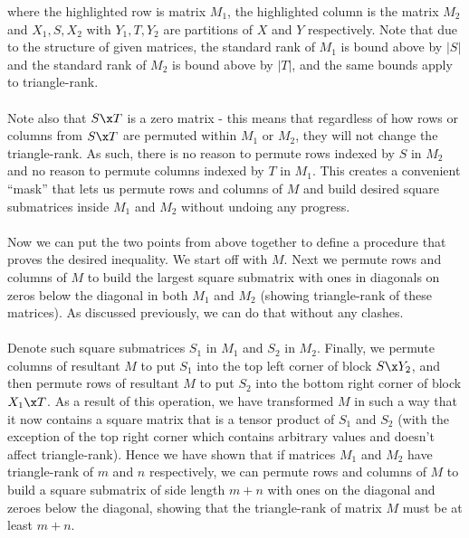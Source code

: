 \documentclass{article}
\begin{document}
\begin{enumerate}
\begin{enumerate}
            where the highlighted row is matrix $M_1$, the highlighted column
            is the matrix $M_2$ and $X_1, S, X_2$ with $Y_1, T, Y_2$ are
            partitions of $X$ and $Y$ respectively. Note that due to the
            structure of given matrices, the standard rank of $M_1$ is bound
            above by $|S|$ and the standard rank of $M_2$ is bound above by
            $|T|$, and the same bounds apply to triangle-rank.
            \\\\
            Note also that $S \x T$ is a zero matrix - this means that
            regardless of how rows or columns from $S \x T$ are permuted within
            $M_1$ or $M_2$, they will not change the triangle-rank. As such,
            there is no reason to permute rows indexed by $S$ in $M_2$ and no
            reason to permute columns indexed by $T$ in $M_1$. This creates a
            convenient ``mask'' that lets us permute rows and columns of $M$
            and build desired square submatrices inside $M_1$ and $M_2$ without 
            undoing any progress.
            \\\\
            Now we can put the two points from above together to define a
            procedure that proves the desired inequality. We start off with
            $M$. Next we permute rows and columns of $M$ to build the largest
            square submatrix with ones in diagonals on zeros below the diagonal
            in both $M_1$ and $M_2$ (showing triangle-rank of these
            matrices). As discussed previously, we can do that without any
            clashes.
            \\\\
            Denote such square submatrices $S_1$ in $M_1$ and $S_2$ in $M_2$.
            Finally, we permute columns of resultant $M$ to put $S_1$ into the
            top left corner of block $S \x Y_2$, and then permute rows of
            resultant $M$ to put $S_2$ into the bottom right corner of block
            $X_1 \x T$. As a result of this operation, we have transformed $M$
            in such a way that it now contains a square matrix that is a tensor
            product of $S_1$ and $S_2$ (with the exception of the top right
            corner which contains arbitrary values and doesn't affect
            triangle-rank). Hence we have shown that if matrices $M_1$ and
            $M_2$ have triangle-rank of $m$ and $n$ respectively, we can
            permute rows and columns of $M$ to build a square submatrix of side
            length $m + n$ with ones on the diagonal and zeroes below the
            diagonal, showing that the triangle-rank of matrix $M$ must be at
            least $m + n$.
            \\


\end{enumerate}
\end{enumerate}
\end{document}
